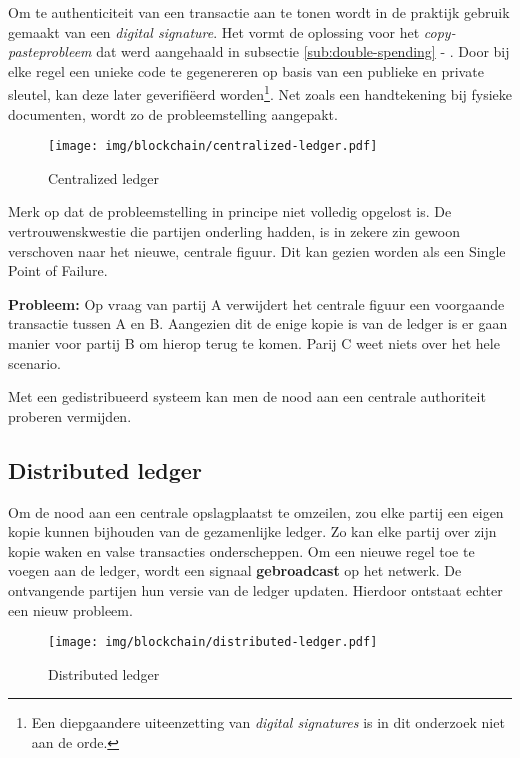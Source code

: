 Om te authenticiteit van een transactie aan te tonen wordt in de praktijk gebruik gemaakt van een \textit{digital signature}. Het vormt de oplossing voor het \textit{copy-pasteprobleem} dat werd aangehaald in subsectie \ref{sub:double-spending} - . Door bij elke regel een unieke code te gegenereren op basis van een publieke en private sleutel, kan deze later geverifiëerd worden\footnote{Een diepgaandere uiteenzetting van \textit{digital signatures} is in dit onderzoek niet aan de orde.}. Net zoals een handtekening bij fysieke documenten, wordt zo de probleemstelling aangepakt.

\begin{figure}[H]
	\centering
	\texttt{[image: img/blockchain/centralized-ledger.pdf]}
	\caption{\label{fig:centralized-ledger}Centralized ledger}
\end{figure}

Merk op dat de probleemstelling in principe niet volledig opgelost is. De vertrouwenskwestie die partijen onderling hadden, is in zekere zin gewoon verschoven naar het nieuwe, centrale figuur. Dit kan gezien worden als een Single Point of Failure.

\textbf{Probleem:} 
Op vraag van partij A verwijdert het centrale figuur een voorgaande transactie tussen A en B. 
Aangezien dit de enige kopie is van de ledger is er gaan manier voor partij B om hierop terug te komen. Parij C weet niets over het hele scenario.

Met een gedistribueerd systeem kan men de nood aan een centrale authoriteit proberen vermijden.


\subsection{Distributed ledger}
\label{sub:distributed-ledger}

Om de nood aan een centrale opslagplaatst te omzeilen, zou elke partij een eigen kopie kunnen bijhouden van de gezamenlijke ledger. Zo kan elke partij over zijn kopie waken en valse transacties onderscheppen. Om een nieuwe regel toe te voegen aan de ledger, wordt een signaal \textbf{gebroadcast} op het netwerk. De ontvangende partijen hun versie van de ledger updaten. Hierdoor ontstaat echter een nieuw probleem.

\begin{figure}[H]
	\centering
	\texttt{[image: img/blockchain/distributed-ledger.pdf]}
	\caption{\label{fig:distributed-ledger}Distributed ledger}
\end{figure}

